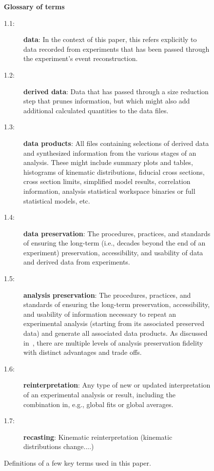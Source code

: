 \documentclass[11pt]{article}
\begin{document}
\begin{figure}[!ht]
\begin{tcolorbox}
\begin{center}
{\large \textbf{Glossary of terms}}
\end{center}
%
\begin{description}
    \item[1.1:] \textbf{\Gls{data}}: In the context of this paper, this refers explicitly to data recorded from experiments that has been passed through the experiment's event reconstruction.
    \item[1.2:] \textbf{\Gls{derived data}}: Data that has passed through a size reduction step that prunes information, but which might also add additional calculated quantities to the data files.
    \item[1.3:] \textbf{\Glspl{data product}}: All files containing selections of derived data and synthesized information from the various stages of an analysis.
These might include summary plots and tables, histograms of kinematic distributions, fiducial cross sections, cross section limits, simplified model results, correlation information, analysis statistical workspace binaries or full statistical models, etc.
    \item[1.4:] \textbf{\Gls{data preservation}}: The procedures, practices, and standards of ensuring the long-term (i.e., decades beyond the end of an experiment) preservation, accessibility, and usability of data and derived data from experiments.
    \item[1.5:] \textbf{\Gls{analysis preservation}}: The procedures, practices, and standards of ensuring the long-term preservation, accessibility, and usability of information necessary to repeat an experimental analysis (starting from its associated preserved data) and generate all associated \glspl{data product}.
    As discussed in~, there are multiple levels of analysis preservation fidelity with distinct advantages and trade offs.
    \item[1.6:] \textbf{\Gls{reinterpretation}}: Any type of new or updated interpretation of an experimental analysis or result, including the combination in, e.g., global fits or global averages. 
    \item[1.7:] \textbf{\Gls{recasting}}: Kinematic reinterpretation (kinematic distributions change....) %
\end{description}
\end{tcolorbox}
\caption{Definitions of a few key terms used in this paper.}
\label{fig:glossary}
\end{figure}
\end{document}
